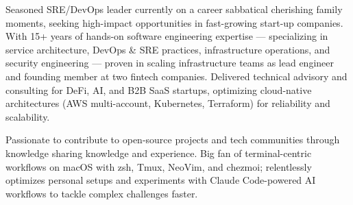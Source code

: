 

\begin{cvparagraph}

Seasoned SRE/DevOps leader currently on a career sabbatical cherishing family moments, seeking high-impact opportunities in fast-growing start-up companies. With 15+ years of hands-on software engineering expertise — specializing in service architecture, DevOps \& SRE practices, infrastructure operations, and security engineering — proven in scaling infrastructure teams as lead engineer and founding member at two fintech companies. Delivered technical advisory and consulting for DeFi, AI, and B2B SaaS startups, optimizing cloud-native architectures (AWS multi-account, Kubernetes, Terraform) for reliability and scalability.

Passionate to contribute to open-source projects and tech communities through knowledge sharing knowledge and experience. Big fan of terminal-centric workflows on macOS with zsh, Tmux, NeoVim, and chezmoi; relentlessly optimizes personal setups and experiments with Claude Code-powered AI workflows to tackle complex challenges faster.
\end{cvparagraph}
